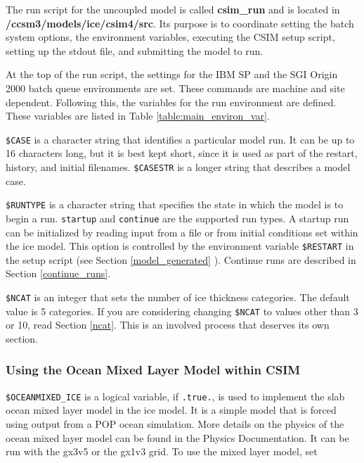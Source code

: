
The run script for the uncoupled model is called {\bf csim\_run} and is
located in {\bf /ccsm3/models/ice/csim4/src}.  Its purpose is to coordinate setting
the batch system options, the environment variables, executing the CSIM
setup script, setting up the stdout file, and submitting the model to run.

At the top of the run script, the settings for the IBM SP and the SGI Origin
2000 batch queue environments are set.  These commands are machine and
site dependent.  Following this, the variables for the run environment
are defined.  These variables are listed in Table \ref{table:main_environ_var}.

{\tt \$CASE} is a character string that identifies a particular model run.
It can be up to 16 characters long, but it is best kept short, since
it is used as part of the restart, history, and initial filenames.
{\tt \$CASESTR} is a longer string that describes a model case.

{\tt \$RUNTYPE} is a character string that specifies the state in which
the model is to begin a run.  {\tt startup} and {\tt continue} are the supported
run types. A startup run can be initialized by reading input from a file
or from initial conditions set within the ice model.  This option is
controlled by the environment variable {\tt \$RESTART} in the setup script
(see Section \ref{model_generated} ). Continue runs are described in
Section \ref{continue_runs}.

{\tt \$NCAT} is an integer that sets the number of ice
thickness categories.  The default value is 5 categories.  If you are 
considering changing {\tt \$NCAT} to values other than 3 or 10, read
Section \ref{ncat}.  This is an involved process that deserves
its own section.

\subsubsection{Using the Ocean Mixed Layer Model within CSIM}

{\tt \$OCEANMIXED\_ICE} is a logical variable, if {\tt .true.}, is used
to implement the slab ocean mixed layer model in the ice model.
It is a simple model that is forced using output from a POP ocean
simulation.  More details on the physics of the ocean mixed layer model
can be found in the Physics Documentation.  It can be run
with the gx3v5 or the gx1v3 grid.  To use the mixed layer model, set


